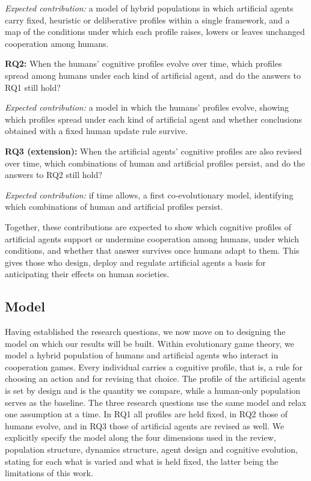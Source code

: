 \textit{Expected contribution:} a model of hybrid populations in which artificial agents carry fixed, heuristic or deliberative profiles within a single framework, and a map of the conditions under which each profile raises, lowers or leaves unchanged cooperation among humans.

\textbf{RQ2:} When the humans' cognitive profiles evolve over time, which profiles spread among humans under each kind of artificial agent, and do the answers to RQ1 still hold?

\textit{Expected contribution:} a model in which the humans' profiles evolve, showing which profiles spread under each kind of artificial agent and whether conclusions obtained with a fixed human update rule survive.

\textbf{RQ3 (extension):} When the artificial agents' cognitive profiles are also revised over time, which combinations of human and artificial profiles persist, and do the answers to RQ2 still hold?

\textit{Expected contribution:} if time allows, a first co-evolutionary model, identifying which combinations of human and artificial profiles persist.

Together, these contributions are expected to show which cognitive profiles of artificial agents support or undermine cooperation among humans, under which conditions, and whether that answer survives once humans adapt to them. This gives those who design, deploy and regulate artificial agents a basis for anticipating their effects on human societies.

\subsection{Model}

Having established the research questions, we now move on to designing the model on which our results will be built. Within evolutionary game theory, we model a hybrid population of humans and artificial agents who interact in cooperation games. Every individual carries a cognitive profile, that is, a rule for choosing an action and for revising that choice. The profile of the artificial agents is set by design and is the quantity we compare, while a human-only population serves as the baseline. The three research questions use the same model and relax one assumption at a time. In RQ1 all profiles are held fixed, in RQ2 those of humans evolve, and in RQ3 those of artificial agents are revised as well. We explicitly specify the model along the four dimensions used in the review, population structure, dynamics structure, agent design and cognitive evolution, stating for each what is varied and what is held fixed, the latter being the limitations of this work.

